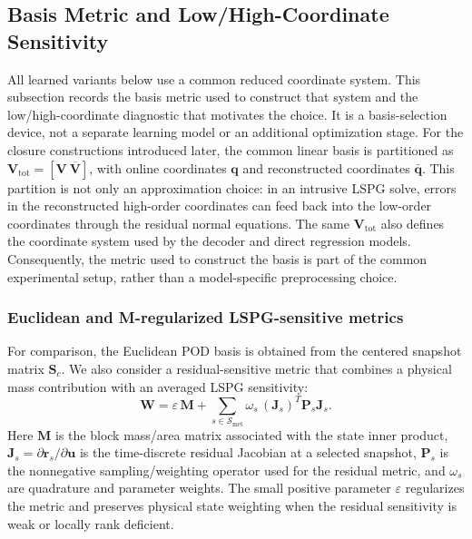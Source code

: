 \documentclass[11pt]{article}
\begin{document}
\subsection{Basis Metric and Low/High-Coordinate Sensitivity}
\label{sec:metric-aware-basis}

All learned variants below use a common reduced coordinate system.  This
subsection records the basis metric used to construct that system and the
low/high-coordinate diagnostic that motivates the choice.  It is a
basis-selection device, not a separate learning model or an additional
optimization stage.  For the closure constructions introduced later, the
common linear basis is partitioned as
$\mathbf V_{\mathrm{tot}}=[\mathbf V\ \overline{\mathbf V}]$, with online
coordinates $\mathbf q$ and reconstructed coordinates $\bar{\mathbf q}$.
This partition is not only an approximation choice: in an intrusive LSPG
solve, errors in the reconstructed high-order coordinates can feed back into
the low-order coordinates through the residual normal equations. The same
$\mathbf V_{\mathrm{tot}}$ also defines the coordinate system used by the
decoder and direct regression models. Consequently, the metric used to
construct the basis is part of the common experimental setup, rather than a
model-specific preprocessing choice.

\subsubsection{Euclidean and M-regularized LSPG-sensitive metrics}
For comparison, the Euclidean POD basis is obtained from the centered snapshot
matrix $\mathbf S_c$. We also consider a residual-sensitive metric
that combines a physical mass contribution with an averaged LSPG sensitivity:
\begin{equation}
\mathbf W
=
\varepsilon\,\mathbf M
+
\sum_{s\in\mathcal S_{\mathrm{met}}}
\omega_s\,
(\mathbf J_s)^T\mathbf P_s\mathbf J_s .
\label{eq:mlspg-metric}
\end{equation}
Here $\mathbf M$ is the block mass/area matrix associated with the state
inner product, $\mathbf J_s=\partial\mathbf r_s/\partial\mathbf u$ is the
time-discrete residual Jacobian at a selected snapshot, $\mathbf P_s$ is the
nonnegative sampling/weighting operator used for the residual metric, and
$\omega_s$ are quadrature and parameter weights. The small positive parameter
$\varepsilon$ regularizes the metric and preserves physical state weighting
when the residual sensitivity is weak or locally rank deficient.
\end{document}
